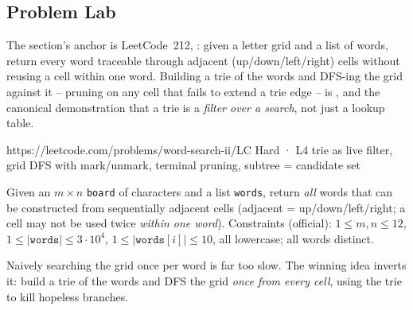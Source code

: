 \subsection{Problem Lab}

The section's anchor is LeetCode~212, : given a letter grid and a list of words,
return every word traceable through adjacent (up/down/left/right) cells without reusing a cell within one
word. Building a trie of the words and DFS-ing the grid against it -- pruning on any cell that fails to
extend a trie edge -- is , and the canonical demonstration that a trie is a
\emph{filter over a search}, not just a lookup table.

  {https://leetcode.com/problems/word-search-ii/}{LC Hard · L4}
  {trie as live filter, grid DFS with mark/unmark, terminal pruning, subtree = candidate set}

\begin{problemstatement}
Given an $m\times n$ \texttt{board} of characters and a list \texttt{words}, return \emph{all} words that
can be constructed from sequentially adjacent cells (adjacent = up/down/left/right; a cell may not be used
twice \emph{within one word}). Constraints (official): $1\le m,n\le 12$, $1\le|\texttt{words}|\le 3\cdot
10^{4}$, $1\le|\texttt{words}[i]|\le 10$, all lowercase; all words distinct.
\end{problemstatement}

\begin{attemptgate}
Naively searching the grid once per word is far too slow. The winning idea inverts it: build a trie of
the words and DFS the grid \emph{once from every cell}, using the trie to kill hopeless branches.
\end{attemptgate}

